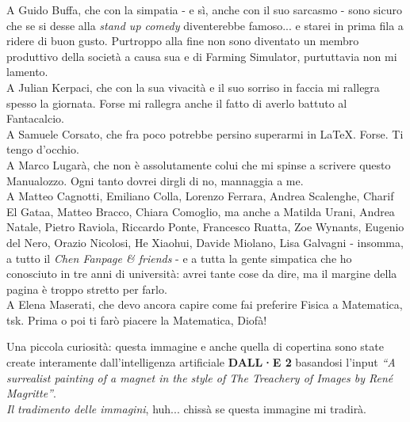 A Guido Buffa, che con la simpatia - e sì, anche con il suo sarcasmo - sono sicuro che se si desse alla \textit{stand up comedy} diventerebbe famoso... e starei in prima fila a ridere di buon gusto. Purtroppo alla fine non sono diventato un membro produttivo della società a causa sua e di Farming Simulator, purtuttavia non mi lamento.\\
A Julian Kerpaci, che con la sua vivacità e il suo sorriso in faccia mi rallegra spesso la giornata. Forse mi rallegra anche il fatto di averlo battuto al Fantacalcio. \\
A Samuele Corsato, che fra poco potrebbe persino superarmi in \LaTeX. {\small Forse.} {\tiny Ti tengo d'occhio.}\\
A Marco Lugarà, che non è assolutamente colui che mi spinse a scrivere questo Manualozzo\texttrademark. {\small Ogni tanto dovrei dirgli di no, mannaggia a me.}\\
A Matteo Cagnotti, Emiliano Colla, Lorenzo Ferrara, Andrea Scalenghe, Charif El Gataa, Matteo Bracco, Chiara Comoglio, ma anche a Matilda Urani, Andrea Natale, Pietro Raviola, Riccardo Ponte, Francesco Ruatta, Zoe Wynants, Eugenio del Nero, Orazio Nicolosi, He Xiaohui, Davide Miolano, Lisa Galvagni - insomma, a tutto il \textit{Chen Fanpage \& friends} - e a tutta la gente simpatica che ho conosciuto in tre anni di università: avrei tante cose da dire, ma il margine della pagina è troppo stretto per farlo.\\
A Elena Maserati, che devo ancora capire come fai preferire Fisica a Matematica, tsk. Prima o poi ti farò piacere la Matematica, Diofà!
\begin{flushright}
	\textcolor{redill}{\href{https://www.youtube.com/watch?v=CjUVTEExfBg}{}}
\end{flushright}
\vfill
\begin{center}
	\begin{frame}{}
	\end{frame}
\end{center}
\vspace{5pt}
\begin{center}
{\scriptsize Una piccola curiosità: questa immagine e anche quella di copertina sono state create interamente dall'intelligenza artificiale \textbf{DALL·E 2} basandosi l'input \textit{``A surrealist painting of a magnet in the style of The Treachery of Images by René Magritte''}.\\
\textit{Il tradimento delle immagini}, huh... chissà se questa immagine mi tradirà.}
\end{center}